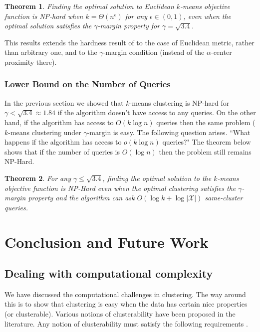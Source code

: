 \documentclass[letterpaper,12pt,titlepage,oneside,final]{book}
\newtheorem{theorem}{Theorem}
\newcommand{\mc}{\mathcal}
\begin{document}
\begin{theorem}
\label{thm:gammaLower}
Finding the optimal solution to Euclidean $k$-means objective function is NP-hard when $k=\Theta(n^\epsilon)$ for any $\epsilon \in (0,1)$, even when the optimal solution satisfies the $\gamma$-margin property for $\gamma = \sqrt{3.4}$.
\end{theorem}

This results extends the hardness result of \cite{ben2014data} to the case of Euclidean 
metric, rather than arbitrary one, and to the $\gamma$-margin condition (instead of the $\alpha$-center proximity there).

\subsection{Lower Bound on the Number of Queries}
In the previous section we showed that $k$-means clustering is NP-hard for $\gamma < \sqrt{3.4} \approx 1.84$ if the algorithm doesn't have access to any queries. On the other hand, if the algorithm has access to $O(k\log n)$ queries then the same problem ($k$-means clustering under $\gamma$-margin is easy. The following question arises. ``What happens if the algorithm has access to $o(k\log n)$ queries?" The theorem below shows that if the number of queries is $O(\log n)$ then the problem still remains NP-Hard.

\begin{theorem}
\label{thm:queryLower}
For any $\gamma \le \sqrt{3.4}$, finding the optimal solution to the $k$-means objective function is NP-Hard even when the optimal clustering satisfies the $\gamma$-margin property and the algorithm can ask $O(\log k + \log |\mc X|)$ same-cluster queries.
\end{theorem}









\chapter{Conclusion and Future Work}
\label{FUTURE}
\section{Dealing with computational complexity}
We have discussed the computational challenges in clustering. The way around this is to show that clustering is easy when the data has certain nice properties (or clusterable). Various notions of clusterability have been proposed in the literature. Any notion of clusterability must satisfy the following requirements \cite{ben2015computational}. 
\end{document}
